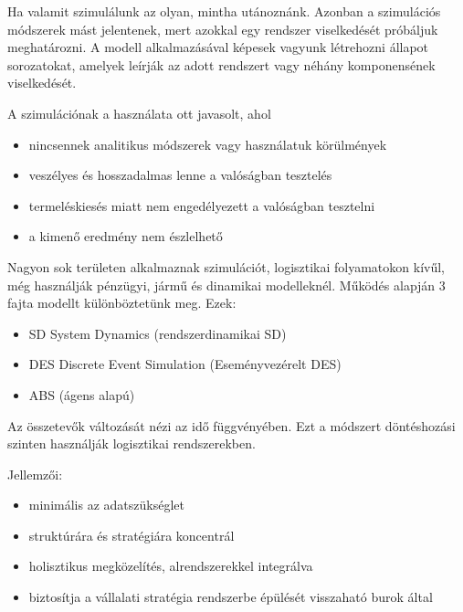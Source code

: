 


Ha valamit szimulálunk az olyan, mintha utánoznánk. Azonban a szimulációs módszerek mást jelentenek, mert azokkal egy rendszer viselkedését próbáljuk meghatározni. A modell alkalmazásával képesek vagyunk létrehozni állapot sorozatokat, amelyek leírják az adott rendszert vagy néhány komponensének viselkedését. 

A szimulációnak a használata ott javasolt, ahol

\begin{itemize}
	\item nincsennek analitikus módszerek vagy használatuk körülmények
	\item veszélyes és hosszadalmas lenne a valóságban tesztelés
	\item termeléskiesés miatt nem engedélyezett a valóságban tesztelni
	\item a kimenő eredmény nem észlelhető
\end{itemize}

Nagyon sok területen alkalmaznak szimulációt, logisztikai folyamatokon kívűl, még használják pénzügyi, jármű és dinamikai modelleknél. 
Működés alapján 3 fajta modellt különböztetünk meg.
Ezek:

\begin{itemize}
	\item SD System Dynamics (rendszerdinamikai SD)
	\item  DES Discrete Event Simulation (Eseményvezérelt DES)
	\item  ABS (ágens alapú)
\end{itemize}


Az összetevők változását nézi az idő függvényében. Ezt a módszert döntéshozási szinten használják logisztikai rendszerekben. 

Jellemzői:

\begin{itemize}
	\item minimális az adatszükséglet
	\item  struktúrára és stratégiára koncentrál
	\item  holisztikus megközelítés, alrendszerekkel integrálva
	\item biztosítja a vállalati stratégia rendszerbe épülését visszaható burok által
\end{itemize}

